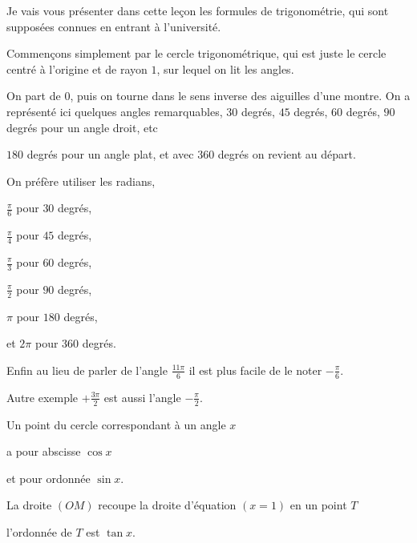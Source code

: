 







\debuttexte

\diapo

Je vais vous présenter dans cette leçon les formules de trigonométrie,
qui sont supposées connues en entrant à l'université.


\diapo

Commençons simplement par le cercle trigonométrique, qui est juste le cercle
centré à l'origine et de rayon $1$, sur lequel on lit les angles.

On part de $0$, puis on tourne dans le sens inverse des aiguilles d'une montre.
On a représenté ici quelques angles remarquables, $30$ degrés,
$45$ degrés, $60$ degrés, $90$ degrés pour un angle droit,
etc

$180$ degrés pour un angle plat,
et avec $360$ degrés on revient au départ.

On préfère utiliser les radians,

$\frac \pi 6$ pour $30$ degrés,

$\frac \pi 4$ pour $45$ degrés,

$\frac\pi 3$ pour $60$ degrés,

$\frac \pi 2$ pour $90$ degrés,

$\pi$ pour $180$ degrés,

et $2\pi$ pour $360$ degrés.

Enfin au lieu de parler de l'angle $\frac{11\pi}{6}$
il est plus facile de le noter $-\frac\pi6$.

Autre exemple $+\frac{3\pi}{2}$ est aussi l'angle $-\frac\pi2$.

\diapo

Un point du cercle correspondant à un angle $x$

a pour abscisse $\cos x$

et pour ordonnée $\sin x$.

\change

La droite $(OM)$ recoupe la droite d'équation $(x=1)$ en un point $T$

l'ordonnée de $T$ est $\tan x$.

